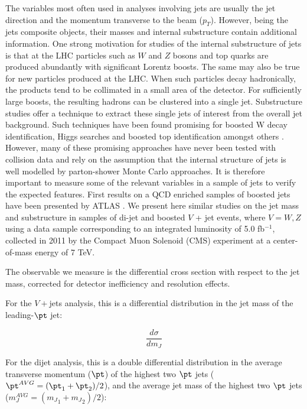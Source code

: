  The variables most often used in analyses involving jets are usually the jet direction and the momentum transverse to the beam ($p_T$). 
However, being  the jets composite objects, their masses and internal substructure contain additional information.
One strong motivation for studies of the internal substructure of jets is that at the LHC particles such as $W$ and $Z$ bosons and top quarks are produced abundantly with significant Lorentz boosts. The same may also be true for new particles produced at the LHC. When
 such particles decay hadronically, the products tend to be collimated in a small area of the detector. For sufficiently large boosts, the resulting hadrons can be clustered into a single jet. Substructure studies offer a technique to extract these single jets of interest from the overall jet background. Such techniques have been found promising for boosted W decay identification, Higgs searches and boosted top identification amongst others \cite{jetsub}. However, many of these promising approaches have never been tested with collision data and rely on the assumption that the internal structure of jets is well modelled by parton-shower Monte Carlo approaches. It is therefore important to measure some of the relevant variables in a sample of jets to verify the expected features. First results on a QCD enriched samples of boosted jets have been presented by ATLAS \cite{atlasJS}. We present here similar studies on the jet mass and substructure in samples of di-jet and boosted $V$ + jet events, where $V=W, Z$ using a data sample corresponding to an integrated luminosity of 5.0 fb$^{-1}$, collected in 2011 by the Compact Muon Solenoid (CMS) experiment at a center-of-mass energy of 7 TeV.
 
The observable we measure is the differential cross section with respect to the jet mass,
corrected for detector inefficiency and resolution effects.

For the $V+$jets analysis, this is a differential distribution 
in %
the jet mass of the leading-$\pt$ jet: 

\begin{equation}
\label{eq:dsigmadmjetvjets}
\frac{d\sigma}{dm_J}
\end{equation}


For the dijet analysis, this is a double differential distribution 
in the average transverse momentum ($\pt$) of
the highest two $\pt$ jets ($\pt^{AVG} = ({\pt}_1 + {\pt}_2) / 2$), and 
the average jet mass of the highest two $\pt$ jets ($m_J^{AVG} = ({m_J}_1 + {m_J}_2) / 2$): 

